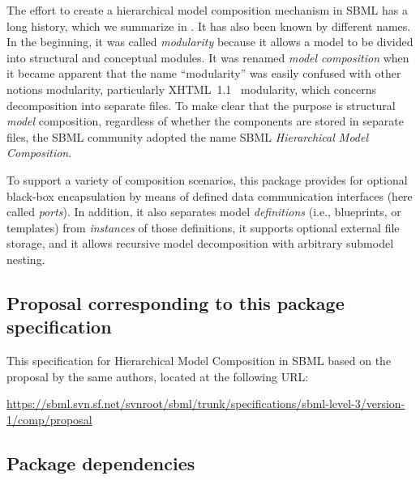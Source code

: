 The effort to create a hierarchical model composition mechanism in SBML has a long history, which we summarize in .  It has also been known by different names.  In the beginning, it was called \emph{modularity} because it allows a model to be divided into structural and conceptual modules.  It was renamed \emph{model   composition} when it became apparent that the name ``modularity'' was easily confused with other notions modularity, particularly XHTML~1.1~\citep{xhtml} modularity, which concerns decomposition into separate files.  To make clear that the purpose is structural \emph{model} composition, regardless of whether the components are stored in separate files, the SBML community adopted the name SBML \emph{Hierarchical Model Composition}.

To support a variety of composition scenarios, this package provides for optional black-box encapsulation by means of defined data communication interfaces (here called \emph{ports}).  In addition, it also separates model \emph{definitions} (i.e., blueprints, or templates) from \emph{instances} of those definitions, it supports optional external file storage, and it allows recursive model decomposition with arbitrary submodel nesting.


\subsection{Proposal corresponding to this package specification}

This specification for Hierarchical Model Composition in SBML  based on the proposal by the same authors, located at the following URL:

\begin{center}
  \vspace*{1ex}\small
  \url{https://sbml.svn.sf.net/svnroot/sbml/trunk/specifications/sbml-level-3/version-1/comp/proposal}
  \vspace*{1ex}
\end{center}



\subsection{Package dependencies}


